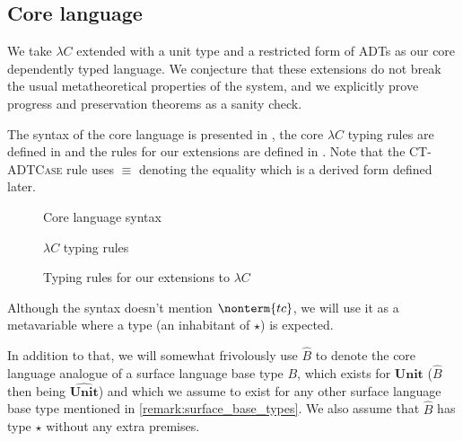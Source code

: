 \documentclass[a4paper]{article}
\newcommand{\Unit}{\textbf{Unit}}
\newcommand{\Unitc}{\widehat{\textbf{Unit}}}
\begin{document}
\subsection{Core language}

We take $\lambda C$ \cite{TTFPLambdaC}
extended with a unit type
and a restricted form of ADTs as our core dependently typed language.
We conjecture that these extensions
do not break the usual metatheoretical properties of the system,
and we explicitly prove progress and preservation theorems as a sanity check.

The syntax of the core language is presented in ,
the core $\lambda C$ typing rules are defined in 
and the rules for our extensions are defined in .
Note that the \textsc{CT-ADTCase} rule uses $\equiv$ denoting the equality
which is a derived form defined later.

\begin{figure}[ht]
  \footnotesize
  \caption{Core language syntax}
  \label{fig:core_syntax}
\end{figure}

\begin{figure}[ht]
  \footnotesize
  \caption{$\lambda C$ typing rules}
  \label{fig:core_typing}
\end{figure}
\begin{figure}[ht]
  \footnotesize
  \caption{Typing rules for our extensions to $\lambda C$}
  \label{fig:core_typing_exts}
\end{figure}

Although the syntax doesn't mention $\nonterm{tc}$, we will use it as a metavariable
where a type (an inhabitant of $\star$) is expected.

In addition to that, we will somewhat frivolously use $\hat B$
to denote the core language analogue of a surface language base type $B$,
which exists for $\Unit$ ($\hat B$ then being $\Unitc$)
and which we assume to exist for any other surface language base type
mentioned in \cref{remark:surface_base_types}.
We also assume that $\hat B$ has type $\star$ without any extra premises.

\newcommand{\dast}{\ **\ }
\end{document}
